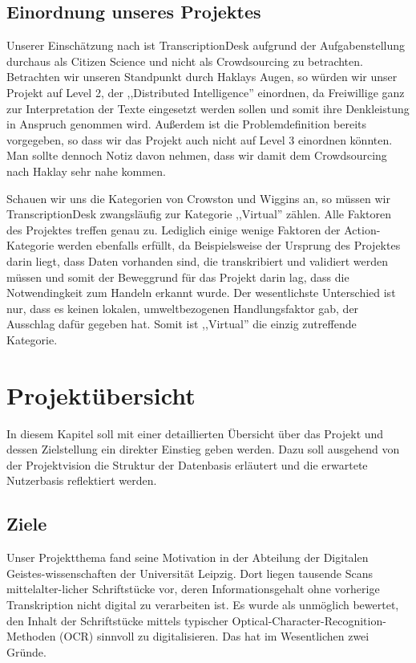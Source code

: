 \documentclass{article}
\begin{document}
\subsection{Einordnung unseres Projektes}
Unserer Einschätzung nach ist TranscriptionDesk aufgrund der Aufgabenstellung durchaus als Citizen Science und nicht als Crowdsourcing zu betrachten.
Betrachten wir unseren Standpunkt durch Haklays Augen, so würden wir unser Projekt auf Level 2, der ,,Distributed Intelligence'' einordnen,
da Freiwillige ganz zur Interpretation der Texte eingesetzt werden sollen und somit ihre Denkleistung in Anspruch genommen wird.
Außerdem ist die Problemdefinition bereits vorgegeben, so dass wir das Projekt auch nicht auf Level 3 einordnen könnten.
Man sollte dennoch Notiz davon nehmen, dass wir damit dem Crowdsourcing nach Haklay sehr nahe kommen.%

Schauen wir uns die Kategorien von Crowston und Wiggins an, so müssen wir TranscriptionDesk zwangsläufig zur Kategorie ,,Virtual'' zählen.
Alle Faktoren des Projektes treffen genau zu.
Lediglich einige wenige Faktoren der Action-Kategorie werden ebenfalls erfüllt, da Beispielsweise der Ursprung des Projektes darin liegt,
dass Daten vorhanden sind, die transkribiert und validiert werden müssen und somit der Beweggrund für das Projekt darin lag,
dass die Notwendingkeit zum Handeln erkannt wurde.
Der wesentlichste Unterschied ist nur, dass es keinen lokalen, umweltbezogenen Handlungsfaktor gab, der Ausschlag dafür gegeben hat.
Somit ist ,,Virtual'' die einzig zutreffende Kategorie.

\section{Projektübersicht}
In diesem Kapitel soll mit einer detaillierten Übersicht über das Projekt und dessen Zielstellung ein direkter Einstieg geben werden.
Dazu soll ausgehend von der Projektvision die Struktur der Datenbasis erläutert und die erwartete Nutzerbasis reflektiert werden.

\subsection{Ziele}
Unser Projektthema fand seine Motivation in der Abteilung der Digitalen Geistes-wissenschaften der Universität Leipzig.
Dort liegen tausende Scans mittelalter-licher Schriftstücke vor, deren Informationsgehalt ohne vorherige Transkription nicht digital zu verarbeiten ist.
Es wurde als unmöglich bewertet, den Inhalt der Schriftstücke mittels typischer Optical-Character-Recognition-Methoden (OCR) sinnvoll zu digitalisieren.
Das hat im Wesentlichen zwei Gründe.
\end{document}

